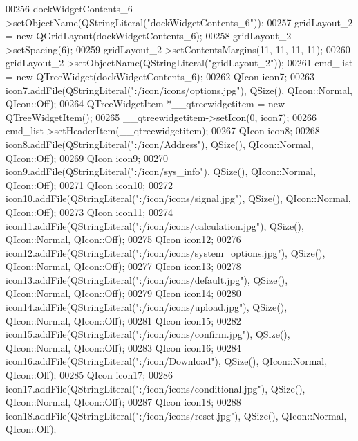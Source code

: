 \begin{DoxyCode}
00256         dockWidgetContents\_6->setObjectName(QStringLiteral(\textcolor{stringliteral}{"dockWidgetContents\_6"}));
00257         gridLayout\_2 = \textcolor{keyword}{new} QGridLayout(dockWidgetContents\_6);
00258         gridLayout\_2->setSpacing(6);
00259         gridLayout\_2->setContentsMargins(11, 11, 11, 11);
00260         gridLayout\_2->setObjectName(QStringLiteral(\textcolor{stringliteral}{"gridLayout\_2"}));
00261         cmd\_list = \textcolor{keyword}{new} QTreeWidget(dockWidgetContents\_6);
00262         QIcon icon7;
00263         icon7.addFile(QStringLiteral(\textcolor{stringliteral}{":/icon/icons/options.jpg"}), QSize(), QIcon::Normal, QIcon::Off);
00264         QTreeWidgetItem *\_\_qtreewidgetitem = \textcolor{keyword}{new} QTreeWidgetItem();
00265         \_\_qtreewidgetitem->setIcon(0, icon7);
00266         cmd\_list->setHeaderItem(\_\_qtreewidgetitem);
00267         QIcon icon8;
00268         icon8.addFile(QStringLiteral(\textcolor{stringliteral}{":/icon/Address"}), QSize(), QIcon::Normal, QIcon::Off);
00269         QIcon icon9;
00270         icon9.addFile(QStringLiteral(\textcolor{stringliteral}{":/icon/sys\_info"}), QSize(), QIcon::Normal, QIcon::Off);
00271         QIcon icon10;
00272         icon10.addFile(QStringLiteral(\textcolor{stringliteral}{":/icon/icons/signal.jpg"}), QSize(), QIcon::Normal, QIcon::Off);
00273         QIcon icon11;
00274         icon11.addFile(QStringLiteral(\textcolor{stringliteral}{":/icon/icons/calculation.jpg"}), QSize(), QIcon::Normal, QIcon::Off);
00275         QIcon icon12;
00276         icon12.addFile(QStringLiteral(\textcolor{stringliteral}{":/icon/icons/system\_options.jpg"}), QSize(), QIcon::Normal, 
      QIcon::Off);
00277         QIcon icon13;
00278         icon13.addFile(QStringLiteral(\textcolor{stringliteral}{":/icon/icons/default.jpg"}), QSize(), QIcon::Normal, QIcon::Off);
00279         QIcon icon14;
00280         icon14.addFile(QStringLiteral(\textcolor{stringliteral}{":/icon/icons/upload.jpg"}), QSize(), QIcon::Normal, QIcon::Off);
00281         QIcon icon15;
00282         icon15.addFile(QStringLiteral(\textcolor{stringliteral}{":/icon/icons/confirm.jpg"}), QSize(), QIcon::Normal, QIcon::Off);
00283         QIcon icon16;
00284         icon16.addFile(QStringLiteral(\textcolor{stringliteral}{":/icon/Download"}), QSize(), QIcon::Normal, QIcon::Off);
00285         QIcon icon17;
00286         icon17.addFile(QStringLiteral(\textcolor{stringliteral}{":/icon/icons/conditional.jpg"}), QSize(), QIcon::Normal, QIcon::Off);
00287         QIcon icon18;
00288         icon18.addFile(QStringLiteral(\textcolor{stringliteral}{":/icon/icons/reset.jpg"}), QSize(), QIcon::Normal, QIcon::Off);

\end{DoxyCode}
